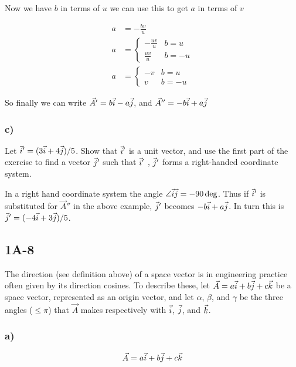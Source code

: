 Now we have $b$ in terms of $u$ we can use this to get $a$ in terms 
of $v$

\begin{align*}
a &= -\frac{bv}{u}\\
a &= \begin{cases} 
      -\frac{uv}{u} & b= u \\
      \frac{uv}{u} & b= -u
   \end{cases}\\
a &= \begin{cases} 
      -v & b= u \\
      v & b= -u
   \end{cases}
\end{align*}

So finally we can write $\vec{A}' = b\vec{i} - a\vec{j}$, and $\vec{A}'' = -b
\vec{i} + a\vec{j}$


\subsubsection*{c)} 
Let $\vec{i}' =(3\vec{i} +4\vec{j})/5$. Show that $\vec{i}'$ 
is a unit vector, and use the first part of the exercise to find a vector $
\vec{j}'$ such that $\vec{i}'$ , $\vec{j}'$ forms a right-handed coordinate system. 

In a right hand coordinate system the angle $\angle\vec{i}\vec{j} = -90\deg$.
Thus if $\vec{i}'$ is substituted for $\vec{A}''$ in the above example, $
\vec{j}'$ becomes $-b\vec{i} + a\vec{j}$.
In turn this is $\vec{j}' = (-4\vec{i} + 3\vec{j})/5$.

\subsection*{1A-8}

The direction (see definition above) of a space vector is in 
engineering practice often given by its direction cosines. To 
describe these, let $\vec{A} = a\vec{i} + b\vec{j} + c\vec{k}$ be a space 
vector, represented as an origin vector, and let $\alpha$, $\beta$, 
and $\gamma$ be the three angles ($\leq\pi$) that $\vec{A}$ makes 
respectively with $\vec{i}$, $\vec{j}$, and $\vec{k}$. 

\subsubsection*{a)}

\begin{equation*}
\vec{A} = a\vec{i} + b\vec{j} +c\vec{k}
\end{equation*}

